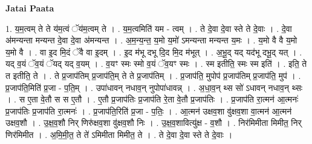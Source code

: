 \documentclass[17pt]{extarticle}
\begin{document}
\textbf{Jatai Paata} \newline

1. य॒म॒त्वम् ते ते य॑म॒त्वं ॅय॑म॒त्वम् ते । . य॒म॒त्वमिति॑ यम - त्वम् । . ते दे॒वा दे॒वा स्ते ते दे॒वाः । . दे॒वा अ॑मन्यन्ता मन्यन्त दे॒वा दे॒वा अ॑मन्यन्त । . अ॒म॒न्य॒न्त॒ य॒मो य॒मो॑ ऽमन्यन्ता मन्यन्त य॒मः । . य॒मो वै वै य॒मो य॒मो वै । . वा इ॒द मि॒दं ॅवै वा इ॒दम् । . इ॒द म॑भू दभू दि॒द मि॒द म॑भूत् । . अ॒भू॒द् यद् यद॑भू दभू॒द् यत् । . यद् व॒यं ॅव॒यं ॅयद् यद् व॒यम् । . व॒यꣳ स्मः स्मो व॒यं ॅव॒यꣳ स्मः । . स्म इतीति॒ स्मः स्म इति॑ । . इति॒ ते त इतीति॒ ते । . ते प्र॒जाप॑तिम् प्र॒जाप॑ति॒म् ते ते प्र॒जाप॑तिम् । . प्र॒जाप॑ति॒ मुपोप॑ प्र॒जाप॑तिम् प्र॒जाप॑ति॒ मुप॑ । . प्र॒जाप॑ति॒मिति॑ प्र॒जा - प॒ति॒म् । . उपा॑धावन् नधाव॒न् नुपोपा॑धावन्न् । . अ॒धा॒व॒न् थ्स सो॑ ऽधावन् नधाव॒न् थ्सः । . स ए॒ता वे॒तौ स स ए॒तौ । . ए॒तौ प्र॒जाप॑तिः प्र॒जाप॑ति रे॒ता वे॒तौ प्र॒जाप॑तिः । . प्र॒जाप॑ति रा॒त्मन॑ आ॒त्मनः॑ प्र॒जाप॑तिः प्र॒जाप॑ति रा॒त्मनः॑ । . प्र॒जाप॑ति॒रिति॑ प्र॒जा - प॒तिः॒ । . आ॒त्मन॑ उक्षव॒शा वु॑क्षव॒शा वा॒त्मन॑ आ॒त्मन॑ उक्षव॒शौ । . उ॒क्ष॒व॒शौ निर् णिरु॑क्षव॒शा वु॑क्षव॒शौ निः । . उ॒क्ष॒व॒शावित्यु॑क्ष - व॒शौ । . निर॑मिमीता मिमीत॒ निर् णिर॑मिमीत । . अ॒मि॒मी॒त॒ ते ते॑ ऽमिमीता मिमीत॒ ते । . ते दे॒वा दे॒वा स्ते ते दे॒वाः । \newline
\end{document}
